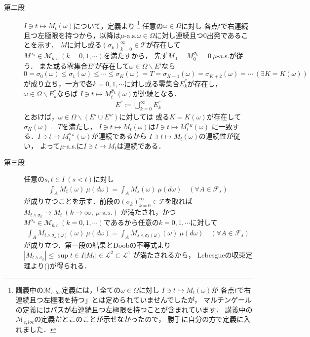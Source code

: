 \begin{prf}
\begin{description}
			\item[第二段] $I \ni t \longmapsto M_t(\omega)$について，定義より
				\footnote{
					講義中の$\mathcal{M}_{c,loc}$定義には，「全ての$\omega \in \Omega$に対し
					$I \ni t \longmapsto M_t(\omega)$が
					各点$t$で右連続且つ左極限を持つ」とは定められていませんでしたが，
					マルチンゲールの定義にはパスが右連続且つ左極限を持つことが含まれています．
					講義中の$\mathcal{M}_{c,loc}$の定義だとこのことが示せなかったので，
					勝手に自分の方で定義に入れました．
				}
				任意の$\omega \in \Omega$に対し
				各点$t$で右連続且つ左極限を持つから，以降は$\mbox{$\mu$-a.s.}\omega \in \Omega$に対し連続且つ0出発であることを示す．
				$M$に対し或る$\left( \sigma_k \right)_{k=0}^{\infty} \in \mathcal{T}$が存在して
				$M^{\sigma_k} \in \mathcal{M}_{b,c}\ (k=0,1,\cdots)$を満たすから，
				先ず$M_0 = M^{\sigma_k}_0 = 0\ \mu$-a.s.が従う．
				また或る零集合$E'$が存在して$\omega \in \Omega \backslash E'$なら
				$0 = \sigma_0(\omega) \leq \sigma_1(\omega) \leq \cdots \leq \sigma_{K}(\omega) = T = \sigma_{K+1}(\omega) = \sigma_{K+2}(\omega) = \cdots\ (\exists K = K(\omega))$
				が成り立ち，一方で各$k =0,1,\cdots$に対し或る零集合$E_k^{''}$が存在し，$\omega \in \Omega \backslash E_k^{''}$ならば
				$I \ni t \longmapsto M^{\hat{\sigma}_k}_t(\omega)$が連続となる．
				\begin{align}
					E^{''} \coloneqq \bigcup_{k=0}^{\infty} E_k^{''}
				\end{align}
				とおけば，$\omega \in \Omega \backslash (E' \cup E'')$に対しては
				或る$K = K(\omega)$が存在して$\sigma_K(\omega) = T$を満たし，
				$I \ni t \longmapsto M_t(\omega)$は$I \ni t \longmapsto M^{\sigma_K}_t(\omega)$
				に一致する．$I \ni t \longmapsto M^{\sigma_K}_t(\omega)$が連続であるから
				$I \ni t \longmapsto M_t(\omega)$の連続性が従い，
				よって$\mu$-a.s.に$I \ni t \longmapsto M_t$は連続である．
				
			\item[第三段] 任意の$s,t \in I\ (s < t)$に対し
				\begin{align}
					\int_A M_t(\omega)\ \mu(d\omega) = \int_A M_s(\omega)\ \mu(d\omega)
					\quad (\forall A \in \mathcal{F}_s)
					\label{thm:thm_quadratic_variation_bounded_then_M_2c_2}
				\end{align}
				が成り立つことを示す．前段の$\left( \sigma_k \right)_{k=0}^{\infty} \in \mathcal{T}$を取れば
				$M_{t \wedge \sigma_k} \longrightarrow M_t\ (k \longrightarrow \infty,\ \mbox{$\mu$-a.s.})$
				が満たされ，かつ
				$M^{\sigma_k} \in \mathcal{M}_{b,c}\ (k=0,1,\cdots)$であるから任意の$k =0,1,\cdots$に対して
				\begin{align}
					\int_A M_{t \wedge \sigma_k(\omega)}(\omega)\ \mu(d\omega) 
					= \int_A M_{s \wedge \sigma_k(\omega)}(\omega)\ \mu(d\omega)
					\quad (\forall A \in \mathcal{F}_s)
				\end{align}
				が成り立つ．第一段の結果とDoobの不等式より
				$\left| M_{t \wedge \sigma_k} \right| \leq \sup{t \in I}{\left| M_t \right|} \in \mathscr{L}^2 \subset \mathscr{L}^1$
				が満たされるから，
				Lebesgueの収束定理より()が得られる．
				\QED
		\end{description}
	\end{prf}
	
\newpage